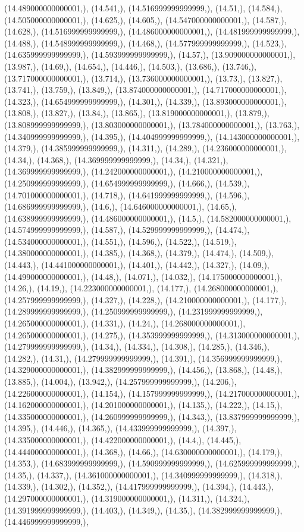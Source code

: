 \documentclass{article}
\begin{document}
(14.489000000000001,), (14.541,), (14.516999999999999,), (14.51,), (14.584,), (14.505000000000001,), (14.625,), (14.605,), (14.547000000000001,), (14.587,), (14.628,), (14.516999999999999,), (14.486000000000001,), (14.481999999999999,), (14.488,), (14.548999999999999,), (14.468,), (14.577999999999999,), (14.523,), (14.635999999999999,), (14.593999999999999,), (14.57,), (13.909000000000001,), (13.987,), (14.69,), (14.654,), (14.446,), (14.503,), (13.686,), (13.746,), (13.717000000000001,), (13.714,), (13.736000000000001,), (13.73,), (13.827,), (13.741,), (13.759,), (13.849,), (13.874000000000001,), (14.717000000000001,), (14.323,), (14.654999999999999,), (14.301,), (14.339,), (13.893000000000001,), (13.808,), (13.827,), (13.84,), (13.865,), (13.819000000000001,), (13.879,), (13.808999999999999,), (13.803000000000001,), (13.784000000000001,), (13.763,), (14.340999999999999,), (14.395,), (14.404999999999999,), (14.143000000000001,), (14.379,), (14.385999999999999,), (14.311,), (14.289,), (14.236000000000001,), (14.34,), (14.368,), (14.369999999999999,), (14.34,), (14.321,), (14.369999999999999,), (14.242000000000001,), (14.210000000000001,), (14.250999999999999,), (14.654999999999999,), (14.666,), (14.539,), (14.701000000000001,), (14.718,), (14.641999999999999,), (14.596,), (14.686999999999999,), (14.6,), (14.646000000000001,), (14.65,), (14.638999999999999,), (14.486000000000001,), (14.5,), (14.582000000000001,), (14.574999999999999,), (14.587,), (14.529999999999999,), (14.474,), (14.534000000000001,), (14.551,), (14.596,), (14.522,), (14.519,), (14.380000000000001,), (14.385,), (14.368,), (14.379,), (14.474,), (14.509,), (14.443,), (14.441000000000001,), (14.401,), (14.442,), (14.327,), (14.09,), (14.499000000000001,), (14.48,), (14.071,), (14.032,), (14.175000000000001,), (14.26,), (14.19,), (14.223000000000001,), (14.177,), (14.268000000000001,), (14.257999999999999,), (14.327,), (14.228,), (14.210000000000001,), (14.177,), (14.289999999999999,), (14.250999999999999,), (14.231999999999999,), (14.265000000000001,), (14.331,), (14.24,), (14.268000000000001,), (14.265000000000001,), (14.275,), (14.353999999999999,), (14.313000000000001,), (14.279999999999999,), (14.34,), (14.334,), (14.308,), (14.285,), (14.346,), (14.282,), (14.31,), (14.279999999999999,), (14.391,), (14.356999999999999,), (14.329000000000001,), (14.382999999999999,), (14.456,), (13.868,), (14.48,), (13.885,), (14.004,), (13.942,), (14.257999999999999,), (14.206,), (14.226000000000001,), (14.154,), (14.157999999999999,), (14.217000000000001,), (14.162000000000001,), (14.201000000000001,), (14.135,), (14.222,), (14.15,), (14.335000000000001,), (14.260999999999999,), (14.343,), (13.837999999999999,), (14.395,), (14.446,), (14.365,), (14.433999999999999,), (14.397,), (14.335000000000001,), (14.422000000000001,), (14.4,), (14.445,), (14.444000000000001,), (14.368,), (14.66,), (14.630000000000001,), (14.179,), (14.353,), (14.683999999999999,), (14.590999999999999,), (14.625999999999999,), (14.35,), (14.337,), (14.361000000000001,), (14.340999999999999,), (14.318,), (14.339,), (14.302,), (14.352,), (14.417999999999999,), (14.394,), (14.443,), (14.297000000000001,), (14.319000000000001,), (14.311,), (14.324,), (14.391999999999999,), (14.403,), (14.349,), (14.35,), (14.382999999999999,), (14.446999999999999,), 
\end{document}
